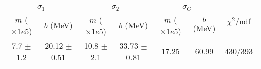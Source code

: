 \begin{tabular}{cc|cc|cc||c}
\multicolumn{2}{c|}{$\sigma_1$} & \multicolumn{2}{|c}{$\sigma_2$} & \multicolumn{2}{|c}{$\sigma_G$}  & \multirow{2}{*}{$\chi^2/$ndf}\\
$m$ ($\times1e5$) & $b$ (MeV) & $m$ ($\times1e5$) & $b$ (MeV) & $m$ ($\times1e5$) & $b$ (MeV) & \\
\hline
7.7 $\pm$ 1.2 & 20.12 $\pm$ 0.51 & 10.8 $\pm$ 2.1 & 33.73 $\pm$ 0.81 & 17.25 & 60.99 & 430/393\\
\end{tabular}
